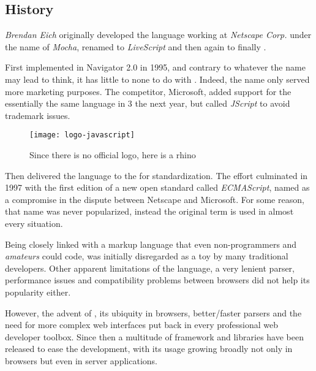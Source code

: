 \subsection{History} %
\label{sub:jshistory}

\emph{Brendan Eich} originally developed the  language working at \emph{Netscape Corp.} under the name of \emph{Mocha}, renamed to \emph{LiveScript} and then again to finally .

First implemented in  Navigator 2.0 in 1995, and contrary to whatever the name may lead to think, it has little to none to do with .
Indeed, the name only served more marketing purposes.
The competitor, Microsoft, added support for the essentially the same language in  3 the next year, but called \emph{JScript} to avoid trademark issues.

\begin{wrapfigure}{r}{0.5\textwidth}
  \centering
    \texttt{[image: logo-javascript]}
  \caption[JavaScript logo]{Since there is no official  logo, here is a rhino}
  \label{fig:javascript-logo}
\end{wrapfigure}

Then  delivered the language to the  for standardization.
The effort culminated in 1997 with the first edition of a new open standard called \emph{ECMAScript}, named as a compromise in the dispute between Netscape and Microsoft.
For some reason, that name was never popularized, instead the original term  is used in almost every situation.

Being closely linked with a markup language that even non-programmers and \emph{amateurs} could code,  was initially disregarded as a toy by many traditional developers.
Other apparent limitations of the language, a very lenient parser, performance issues and compatibility problems between browsers did not help its popularity either.

However, the advent of , its ubiquity in browsers, better/faster parsers and the need for more complex web interfaces put  back in every professional web developer toolbox.
Since then a multitude of framework and libraries have been released to ease the development, with its usage growing broadly not only in browsers but even in server applications.

